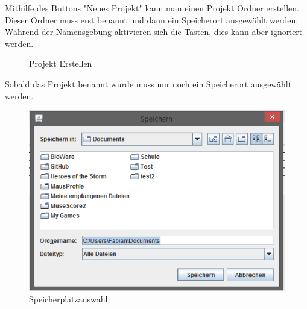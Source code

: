 Mithilfe des Buttons "Neues Projekt" kann man einen Projekt Ordner erstellen. Dieser Ordner muss erst benannt und dann ein Speicherort ausgewählt werden. Während der Namensgebung aktivieren sich die Tasten, dies kann aber ignoriert werden. 

\begin{figure}
\caption{Projekt Erstellen}
\end{figure}

Sobald das Projekt benannt wurde muss nur noch ein Speicherort ausgewählt werden.

\begin{figure}[hbtp]
\centering
\includegraphics[scale=1]{Bilder/ProjektSpeichern.PNG}
\caption{Speicherplatzauswahl}
\end{figure}



